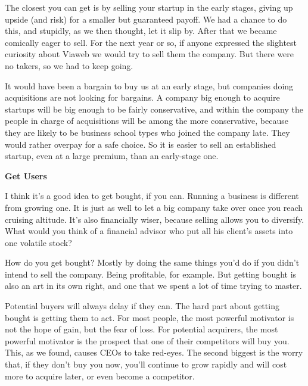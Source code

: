 The
                    closest you can get is by selling your startup in the early
                    stages, giving up upside (and risk) for a smaller but
                    guaranteed payoff. We had a chance to do this, and stupidly,
                    as we then thought, let it slip by. After that we became
                    comically eager to sell. For the next year or so, if anyone
                    expressed the slightest curiosity about Viaweb we would try
                    to sell them the company. But there were no takers, so we
                    had to keep going.

It would have been a bargain
                    to buy us at an early stage, but companies doing
                    acquisitions are not looking for bargains. A company big
                    enough to acquire startups will be big enough to be fairly
                    conservative, and within the company the people in charge of
                    acquisitions will be among the more conservative, because
                    they are likely to be business school types who joined the
                    company late. They would rather overpay for a safe choice.
                    So it is easier to sell an established startup, even at a
                    large premium, than an early-stage one.

\textbf{Get Users}

I think it's a good idea to get bought, if you
                    can. Running a business is different from growing one. It is
                    just as well to let a big company take over once you reach
                    cruising altitude. It's also financially wiser, because
                    selling allows you to diversify. What would you think of a
                    financial advisor who put all his client's assets into one
                    volatile stock?

How do you get bought? Mostly by
                    doing the same things you'd do if you didn't intend to sell
                    the company. Being profitable, for example. But getting
                    bought is also an art in its own right, and one that we
                    spent a lot of time trying to master.

Potential
                    buyers will always delay if they can. The hard part about
                    getting bought is getting them to act. For most people, the
                    most powerful motivator is not the hope of gain, but the
                    fear of loss. For potential acquirers, the most powerful
                    motivator is the prospect that one of their competitors will
                    buy you. This, as we found, causes CEOs to take red-eyes.
                    The second biggest is the worry that, if they don't buy you
                    now, you'll continue to grow rapidly and will cost more to
                    acquire later, or even become a competitor.

